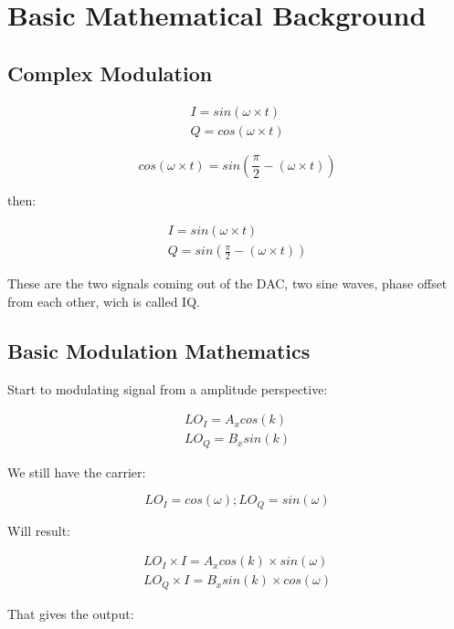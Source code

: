 \section{Basic Mathematical Background}

\subsection{Complex Modulation}

\begin{eqnarray}
	I = sin(\omega \times t)\\
	Q = cos(\omega \times t)
\end{eqnarray}

\begin{equation}
	cos(\omega \times t) = sin(\frac{\pi}{2} - (\omega \times t))
\end{equation}

then:

\begin{eqnarray}
	I = sin(\omega \times t)\\
	Q = sin(\frac{\pi}{2} - (\omega \times t))
\end{eqnarray}

These are the two signals coming out of the DAC, two sine waves, phase offset from each other, wich is called IQ.

\subsection{Basic Modulation Mathematics}

Start to modulating signal from a amplitude perspective:

\begin{eqnarray}
LO_I = A_x cos(k)\\
LO_Q = B_x sin(k)
\end{eqnarray}

We still have the carrier:

\begin{equation}
LO_I = cos(\omega) ; LO_Q = sin(\omega)
\end{equation}

Will result:

\begin{eqnarray}
LO_I \times I = A_x cos(k) \times sin(\omega)\\
LO_Q \times I = B_x sin(k) \times cos(\omega)
\end{eqnarray}


That gives the output:

